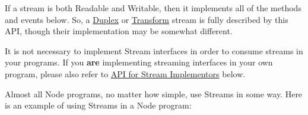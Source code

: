 If a stream is both Readable and Writable, then it implements all of the
methods and events below. So, a
\hyperref[stream\_class\_stream\_duplex]{Duplex} or
\hyperref[stream\_class\_stream\_transform]{Transform} stream is fully
described by this API, though their implementation may be somewhat
different.

It is not necessary to implement Stream interfaces in order to consume
streams in your programs. If you \textbf{are} implementing streaming
interfaces in your own program, please also refer to
\hyperref[stream\_api\_for\_stream\_implementors]{API for Stream
Implementors} below.

Almost all Node programs, no matter how simple, use Streams in some way.
Here is an example of using Streams in a Node program:

\begin{Shaded}
\begin{Highlighting}[]
 \NormalTok{);}

 \NormalTok{(} 

   \NormalTok{;}
  \NormalTok{(}\NormalTok{);}

  \NormalTok{(}\NormalTok{, } 
  \NormalTok{\})}

  \NormalTok{(}\NormalTok{, } \NormalTok{() \{}
     \NormalTok{\{}
       
    \NormalTok{\} } 
       \NormalTok{= }\NormalTok{;}
       \NormalTok{(} \NormalTok{+ }\NormalTok{);}
    \NormalTok{\}}


\end{Highlighting}
\end{Shaded}
